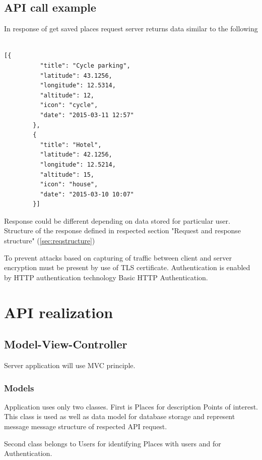 \documentclass[thesis=M,english]{FITthesis}[2012/10/20]
\begin{document}
\subsection{API call example}

In response of get saved places request server returns data similar to the following

\begin{lstlisting}

[{
          "title": "Cycle parking",
          "latitude": 43.1256,
          "longitude": 12.5314,
          "altitude": 12,
          "icon": "cycle",
          "date": "2015-03-11 12:57"
        },
        {
          "title": "Hotel",
          "latitude": 42.1256,
          "longitude": 12.5214,
          "altitude": 15,
          "icon": "house",
          "date": "2015-03-10 10:07"
        }]

\end{lstlisting}

Response could be different depending on data stored for particular user. Structure of the response defined in respected section "Request and response structure" (\ref{sec:reqstructure})

To prevent attacks based on capturing of traffic between client and server encryption must be present by use of TLS certificate.
Authentication is enabled by HTTP authentication technology Basic HTTP Authentication.

\section{API realization}


\subsection{Model-View-Controller}
Server application will use MVC principle. 

\subsubsection{Models}

Application uses only two classes. First is Places for description Points of interest. This class is used as well as data model for database storage and represent message message structure of respected API request.

Second class belongs to Users for identifying Places with users and for Authentication.
\end{document}
